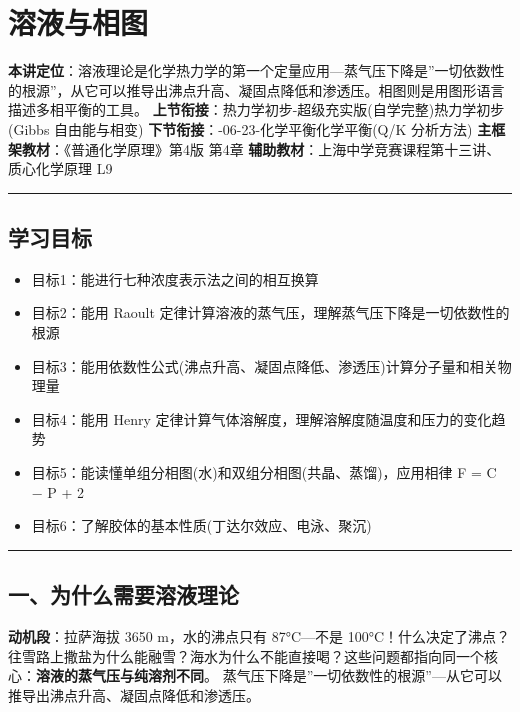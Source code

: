 \section{溶液与相图}\label{ux6eb6ux6db2ux4e0eux76f8ux56fe}

\textbf{本讲定位}：溶液理论是化学热力学的第一个定量应用---蒸气压下降是''一切依数性的根源''，从它可以推导出沸点升高、凝固点降低和渗透压。相图则是用图形语言描述多相平衡的工具。
\textbf{上节衔接}： 热力学初步-超级充实版(自学完整)\textbar 热力学初步(Gibbs 自由能与相变)
\textbf{下节衔接}：-06-23-化学平衡\textbar 化学平衡(Q/K 分析方法)
\textbf{主框架教材}：《普通化学原理》第4版 第4章
\textbf{辅助教材}：上海中学竞赛课程第十三讲、质心化学原理 L9

\begin{center}\rule{0.5\linewidth}{0.5pt}\end{center}

\subsection{学习目标}\label{ux5b66ux4e60ux76eeux6807}

\begin{itemize}
\tightlist
\item
  目标1：能进行七种浓度表示法之间的相互换算
\item
  目标2：能用 Raoult 定律计算溶液的蒸气压，理解蒸气压下降是一切依数性的根源
\item
  目标3：能用依数性公式(沸点升高、凝固点降低、渗透压)计算分子量和相关物理量
\item
  目标4：能用 Henry 定律计算气体溶解度，理解溶解度随温度和压力的变化趋势
\item
  目标5：能读懂单组分相图(水)和双组分相图(共晶、蒸馏)，应用相律 F = C − P + 2
\item
  目标6：了解胶体的基本性质(丁达尔效应、电泳、聚沉)
\end{itemize}

\begin{center}\rule{0.5\linewidth}{0.5pt}\end{center}

\subsection{一、为什么需要溶液理论}\label{ux4e00ux4e3aux4ec0ux4e48ux9700ux8981ux6eb6ux6db2ux7406ux8bba}

\textbf{动机段}：拉萨海拔 3650 m，水的沸点只有 87°C---不是 100°C！什么决定了沸点？往雪路上撒盐为什么能融雪？海水为什么不能直接喝？这些问题都指向同一个核心：\textbf{溶液的蒸气压与纯溶剂不同}。
蒸气压下降是''一切依数性的根源''---从它可以推导出沸点升高、凝固点降低和渗透压。

